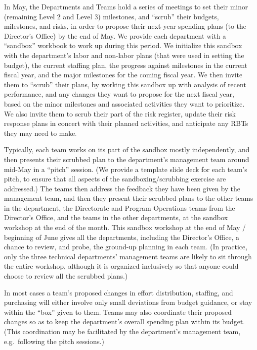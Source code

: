 In May, the Departments and Teams hold a series of meetings to set their minor (remaining Level 2 and Level 3) milestones, and ``scrub'' their budgets, milestones, and risks, in order to propose their next-year spending plans (to the \gls{Director}'s Office) by the end of May.
We provide each department with a ``sandbox'' workbook to work up during this period.
We initialize this sandbox with the department's labor and non-labor plans (that were used in setting the budget), the current staffing plan, the progress against milestones in the current fiscal year, and the major milestones for the coming fiscal year.
We then invite them to ``scrub'' their plans, by working this sandbox up with analysis of recent performance, and any changes they want to propose for the next fiscal year, based on the minor milestones and associated activities they want to prioritize.
We also invite them to scrub their part of the risk register, update their risk response plans in concert with their planned activities, and anticipate any \glspl{RBT} they may need to make.

Typically, each team works on its part of the sandbox mostly independently, and then presents their scrubbed plan to the department's management team around mid-May in a ``pitch'' session.
(We provide a template slide deck for each team's pitch, to ensure that all aspects of the sandboxing/scrubbing exercise are addressed.)
The teams then address the feedback they have been given by the management team, and then they present their scrubbed plans to the other teams in the department, the Directorate and Program \gls{Operations} teams from the \gls{Director}'s Office, and the teams in the other departments, at the sandbox workshop at the end of the month.
This sandbox workshop at the end of May / beginning of June gives all the departments, including the \gls{Director}'s Office, a chance to review, and probe, the ground-up planning in each team.
(In practice, only the three technical departments' management teams are likely to sit through the entire workshop, although it is organized inclusively so that anyone could choose to review all the scrubbed plans.)

In most cases a team's proposed changes in effort distribution, staffing, and purchasing will either involve only small deviations from budget guidance, or stay within the ``box'' given to them.
Teams may also coordinate their proposed changes so as to keep the department's overall spending plan within its budget.
(This coordination may be facilitated by the department's management team, e.g.\ following the pitch sessions.)

